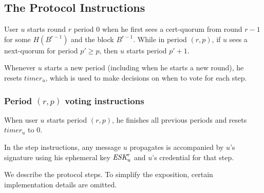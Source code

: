 \documentclass[../main.tex]{subfiles}
\begin{document}
\subsection{The Protocol Instructions}
User $u$ starts round $r$ period $0$ when he first sees a cert-quorum from round $r-1$ for some $H(B^{r-1})$ and the block $B^{r-1}$. 
While in period $(r,p)$, if $u$ sees a next-quorum for period $p' \geq p$, then $u$ starts period $p'+1$.

Whenever $u$ starts a new period (including when he starts a new round), he resets $timer_u$, which is used to make decisions on when to vote for each step.

\subsubsection{Period $(r,p)$ voting instructions}

When user $u$ starts period $(r,p)$, he finishes all previous periods and resets $timer_u$ to $0$.

In the step instructions, any message $u$ propagates is accompanied by $u$'s signature using his ephemeral key $\textit{ESK}^r_u$ and
$u$'s credential for that step.

We describe the protocol steps. To simplify the exposition, certain implementation details are omitted.
\end{document}
